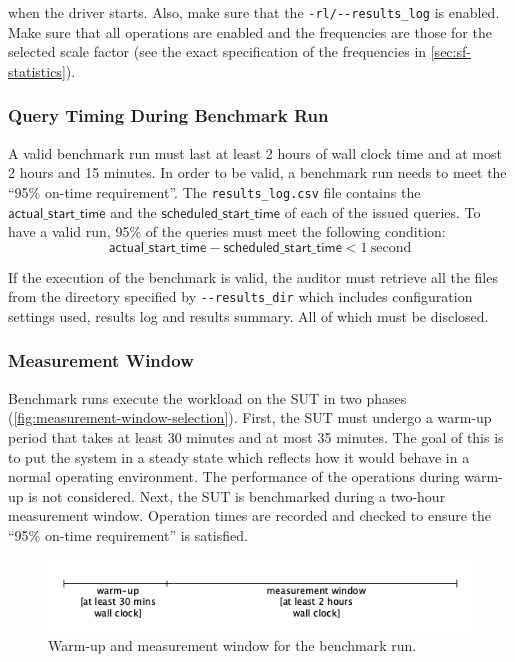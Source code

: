 \begin{description}
    when the driver starts. Also, make sure that the \verb|-rl/--results_log| is enabled. Make sure that all operations are enabled and the frequencies are those for the selected scale factor (see the exact specification of the frequencies in \autoref{sec:sf-statistics}).
\end{description}

\subsubsection{Query Timing During Benchmark Run}
\label{sec:ontime-requirements}
A valid benchmark run must last at least 2 hours of wall clock time and at most 2 hours and 15 minutes.
In order to be valid, a benchmark run needs to meet the ``95\% on-time requirement''.
The \texttt{results\_log.csv} file contains the $\mathsf{actual\_start\_time}$ and the $\mathsf{scheduled\_start\_time}$ of each of the issued queries. To have a valid run, 95\% of the queries must meet the following condition:
\begin{equation*}
\mathsf{actual\_start\_time} - \mathsf{scheduled\_start\_time} < 1\
\mathrm{second}
\end{equation*}

If the execution of the benchmark is valid, the auditor must retrieve all the files from the directory specified by \verb|--results_dir| which includes configuration settings used, results log and results summary. All of which must be disclosed.

\subsubsection{Measurement Window}
\label{sec:transaction-workload-measurement-window}

Benchmark runs execute the workload on the SUT in two phases (\autoref{fig:measurement-window-selection}).
First, the SUT must undergo a warm-up period that takes at least 30 minutes and at most 35 minutes. The goal of this is to put the system in a steady state which reflects how it would behave in a normal operating environment. The performance of the operations during warm-up is not considered.
Next, the SUT is benchmarked during a two-hour measurement window. Operation times are recorded and checked to ensure the ``95\% on-time requirement'' is satisfied.

\begin{figure}[h]
    \centering
    \includegraphics[width=.7\linewidth]{figures/measurement-window-selection}
    \caption{Warm-up and measurement window for the benchmark run.}
    \label{fig:measurement-window-selection}
\end{figure}

